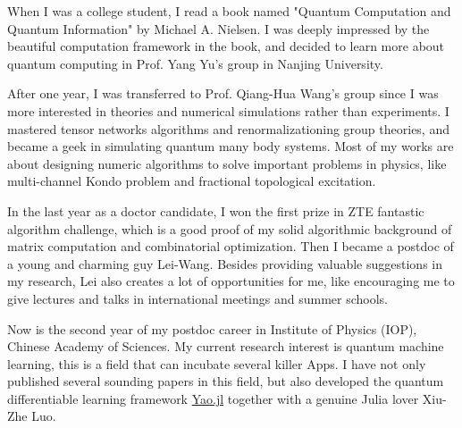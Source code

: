 \documentclass[letterpaper]{article}
\renewenvironment{itemize}{
  \begin{list}{}{
    \setlength{\leftmargin}{1.5em}
  }
}{
  \end{list}
}
\begin{document}
\begin{itemize}
    \item [1] When I was a college student, I read a book named "Quantum Computation and Quantum Information" by Michael A. Nielsen.
        I was deeply impressed by the beautiful computation framework in the book, and decided to learn more about quantum computing in Prof. Yang Yu's group in Nanjing University.
    \item [2] After one year, I was transferred to Prof. Qiang-Hua Wang's group since I was more interested in theories and numerical simulations rather than experiments. I mastered tensor networks algorithms and renormalizationing group theories, and became a geek in simulating quantum many body systems. Most of my works are about designing numeric algorithms to solve important problems in physics, like multi-channel Kondo problem and fractional topological excitation.
    \item [3] In the last year as a doctor candidate, I won the first prize in ZTE fantastic algorithm challenge, which is a good proof of my solid algorithmic background of matrix computation and combinatorial optimization. Then I became a postdoc of a young and charming guy Lei-Wang. Besides providing valuable suggestions in my research, Lei also creates a lot of opportunities for me, like encouraging me to give lectures and talks in international meetings and summer schools.
    \item [4] Now is the second year of my postdoc career in Institute of Physics (IOP), Chinese Academy of Sciences. My current research interest is quantum machine learning, this is a field that can incubate several killer Apps. I have not only published several sounding papers in this field, but also developed the quantum differentiable learning framework \href{https://github.com/QuantumBFS/Yao.jl}{Yao.jl} together with a genuine Julia lover Xiu-Zhe Luo.
\end{itemize}
\end{document}
